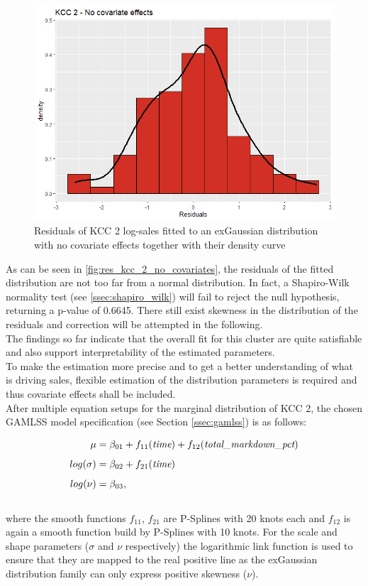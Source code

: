 \begin{figure}[H]
\centering
  \includegraphics[width=0.45\linewidth]{figures/res_kcc_2_no_covariates.png}
  \caption{Residuals of KCC 2 log-sales fitted to an exGaussian distribution with no covariate effects together with their density curve}
  \label{fig:res_kcc_2_no_covariates}
\end{figure}

As can be seen in \autoref{fig:res_kcc_2_no_covariates}, the residuals of the fitted distribution are not too far from a normal distribution. 
In fact, a Shapiro-Wilk normality test (see \ref{ssec:shapiro_wilk}) will fail to reject the null hypothesis, returning a p-value of 0.6645.
There still exist skewness in the distribution of the residuals and correction will be attempted in the following. \\

The findings so far indicate that the overall fit for this cluster are quite satisfiable and also support interpretability of the estimated parameters. \\
To make the estimation more precise and to get a better understanding of what is driving sales, flexible estimation of the distribution parameters is required and thus covariate effects shall be included. \\

After multiple equation setups for the marginal distribution of \ac{KCC} 2, the chosen \ac{GAMLSS} model specification (see Section \ref{ssec:gamlss}) is as follows:

\begin{equation}
\begin{aligned}
\mu &= \beta_{01} + f_{11}(\textit{time}) + f_{12}(\textit{total\_markdown\_pct}) \\ \noalign{\vskip5pt}
log(\sigma) &= \beta_{02} + f_{21}(\textit{time}) \\ \noalign{\vskip5pt}
log(\nu) &=  \beta_{03}, 
\end{aligned}
\label{eq:gamlss_kcc_2}
\end{equation} \\
where the smooth functions $f_{11}$, $f_{21}$ are P-Splines with 20 knots each and $f_{12}$ is again a smooth function build by P-Splines with 10 knots. For the scale and shape parameters ($\sigma$ and $\nu$ respectively) the logarithmic link function is used to ensure that they are mapped to the real positive line as the exGaussian distribution family can only express positive skewness ($\nu$). \\

